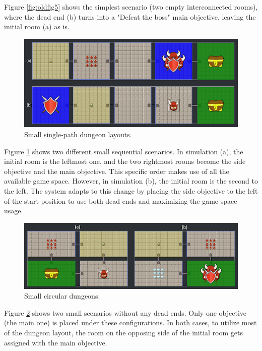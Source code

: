 Figure \ref{fig:oldfig5} shows the simplest scenario (two empty interconnected rooms), where the dead end (b) turns into a "Defeat the boss" main objective, leaving the initial room (a) as is. 

\begin{figure}[h]
  \centering
  \includegraphics[width=\columnwidth]{included-papers-tex/paper-7/Figures/results2.png}
  \caption{Small single-path dungeon layouts.}
  \label{fig:oldfig6}
\end{figure}


Figure \ref{fig:oldfig6} shows two different small sequential scenarios. In simulation (a), the initial room is the leftmost one, and the two rightmost rooms become the side objective and the main objective. This specific order makes use of all the available game space. However, in simulation (b), the initial room is the second to the left. The system adapts to this change by placing the side objective to the left of the start position to use both dead ends and maximizing the game space usage. %

\begin{figure}[h]
  \centering
  \includegraphics[width=\columnwidth]{included-papers-tex/paper-7/Figures/results3.png}
  \caption{Small circular dungeons.}
  \label{fig:oldfig7}
\end{figure}

Figure \ref{fig:oldfig7} shows two small scenarios without any dead ends. Only one objective (the main one) is placed under these configurations. In both cases, to utilize most of the dungeon layout, the room on the opposing side of the initial room gets assigned with the main objective.

